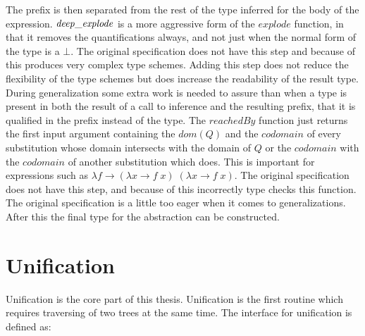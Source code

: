 \documentclass[twoside, titlepage, openright, a4paper]{book}
\newcommand{\Conid}[1]{\mathit{#1}}
\newcommand{\Varid}[1]{\mathit{#1}}
\begin{document}
The prefix is then separated from the rest of the type inferred for the body of the expression. \ensuremath{\Varid{deep\char95 explode}} is a more aggressive form of the \ensuremath{\Varid{explode}} function, in that it removes the quantifications always, and not just when the normal form of the type is a \ensuremath{\bot}. The original specification does not have this step and because of this produces very complex type schemes. Adding this step does not reduce the flexibility of the type schemes but does increase the readability of the result type. 
During generalization some extra work is needed to assure than when a type is present in both the result of a call to inference and the resulting prefix, that it is qualified in the prefix instead of the type.
The \ensuremath{\Varid{reachedBy}} function just returns the first input argument containing the \ensuremath{\Varid{dom}(\Conid{Q})} and the \ensuremath{\Varid{codomain}} of every substitution whose domain intersects with the domain of \ensuremath{\Conid{Q}} or the \ensuremath{\Varid{codomain}} with the \ensuremath{\Varid{codomain}} of another substitution which does. This is important for expressions such as \ensuremath{\lambda \Varid{f}\to (\lambda \Varid{x}\to \Varid{f}\;\Varid{x})\;(\lambda \Varid{x}\to \Varid{f}\;\Varid{x})}. The original specification does not have this step, and because of this incorrectly type checks this function. The original specification is a little too eager when it comes to generalizations. After this the final type for the abstraction can be constructed.

\section{Unification}
Unification is the core part of this thesis. Unification is the first routine which requires traversing of two trees at the same time. The interface for unification is defined as:
\end{document}
